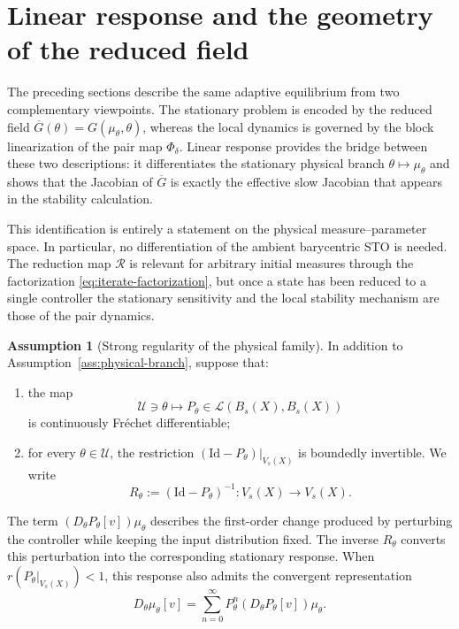 \documentclass[11pt]{article}
\theoremstyle{definition}
\newtheorem{assumption}[theorem]{Assumption}
\theoremstyle{remark}
\newcommand{\Id}{\mathrm{Id}}
\begin{document}
{\section{Linear response and the geometry of the reduced field}\label{LR}

The preceding sections describe the same adaptive equilibrium from two
complementary viewpoints.  The stationary problem is encoded by the reduced
field
\(
  \overline G(\theta)=G(\mu_\theta,\theta)
\),
whereas the local dynamics is governed by the block linearization of the pair
map \(\Phi_\delta\).  Linear response provides the bridge between these two
descriptions: it differentiates the stationary physical branch
\(\theta\mapsto\mu_\theta\) and shows that the Jacobian of
\(\overline G\) is exactly the effective slow Jacobian that appears in the
stability calculation.

This identification is entirely a statement on the physical measure--parameter
space.  In particular, no differentiation of the ambient barycentric STO is
needed.  The reduction map \(\mathcal R\) is relevant for arbitrary initial
measures through the factorization \eqref{eq:iterate-factorization}, but once a
state has been reduced to a single controller the stationary sensitivity and
the local stability mechanism are those of the pair dynamics.

\begin{assumption}[Strong regularity of the physical family]
\label{ass:physical-regularity}
In addition to Assumption~\ref{ass:physical-branch}, suppose that:
\begin{enumerate}[label=(\roman*)]
  \item the map
        \[
          \mathcal U\ni\theta\longmapsto
          P_\theta\in\mathcal L(B_s(X),B_s(X))
        \]
        is continuously Fr\'echet differentiable;
  \item for every \(\theta\in\mathcal U\), the restriction
        \((\Id-P_\theta)|_{V_s(X)}\) is boundedly invertible.  We write
        \begin{equation}
          R_\theta:=(\Id-P_\theta)^{-1}:V_s(X)\to V_s(X).
          \label{eq:physical-resolvent}
        \end{equation}
\end{enumerate}
\end{assumption}


The term $(D_\theta P_\theta[v])\mu_\theta$ describes the
first-order change produced by perturbing the controller
while keeping the input distribution fixed.
The inverse $R_\theta$ converts this perturbation into the
corresponding stationary response.
When $r(P_\theta|_{V_s(X)})<1$, this response also admits
the convergent representation
\[
  D_\theta\mu_\theta[v]
  =\sum_{n=0}^{\infty}
    P_\theta^n(D_\theta P_\theta[v])\mu_\theta.
\]


}
\end{document}
